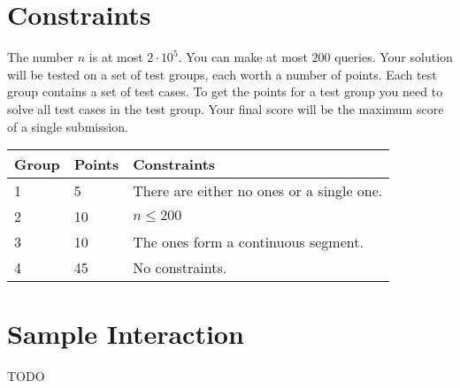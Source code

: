 \section*{Constraints}
The number $n$ is at most $2 \cdot 10^5$. You can make at most $200$ queries.
Your solution will be tested on a set of test groups, each worth a number of points.
Each test group contains a set of test cases.
To get the points for a test group you need to solve all test cases in the test group.
Your final score will be the maximum score of a single submission.

\noindent
\begin{tabular}{| l | l | l |}
\hline
Group & Points & Constraints \\ \hline
1     & 5     & There are either no ones or a single one. \\ \hline
2     & 10    & $n \leq 200$ \\ \hline
3     & 10    & The ones form a continuous segment. \\ \hline
4     & 45    & No constraints. \\ \hline
\end{tabular}

\section*{Sample Interaction}
TODO
